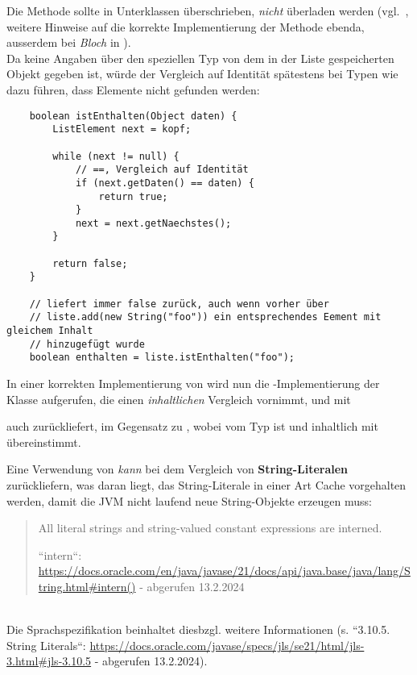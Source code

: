 Die Methode  sollte in Unterklassen überschrieben, \textit{nicht} überladen werden (vgl.~\cite[654]{Ull23}, weitere Hinweise auf die korrekte Implementierung der Methode ebenda, ausserdem bei \textit{Bloch} in \cite[37]{Blo18}).\\

\noindent
Da keine Angaben über den speziellen Typ von dem in der Liste gespeicherten Objekt gegeben ist, würde der Vergleich auf Identität spätestens bei Typen wie  dazu führen, dass Elemente nicht gefunden werden:

\begin{verbatim}
    boolean istEnthalten(Object daten) {
        ListElement next = kopf;

        while (next != null) {
            // ==, Vergleich auf Identität
            if (next.getDaten() == daten) {
                return true;
            }
            next = next.getNaechstes();
        }

        return false;
    }

    // liefert immer false zurück, auch wenn vorher über
    // liste.add(new String("foo")) ein entsprechendes Eement mit gleichem Inhalt
    // hinzugefügt wurde
    boolean enthalten = liste.istEnthalten("foo");
\end{verbatim}

In einer korrekten Implementierung von  wird nun die -Implementierung der Klasse  aufgerufen, die einen \textit{inhaltlichen} Vergleich vornimmt, und mit \begin{center}\end{center} auch  zurückliefert, im Gegensatz zu , wobei  vom Typ  ist und inhaltlich mit  übereinstimmt.\\

\begin{tcolorbox}[title=String-Literale]
Eine Verwendung von \code{==} \textit{kann} bei dem Vergleich von \textbf{String-Literalen}  zurückliefern, was daran liegt, das String-Literale in einer Art Cache vorgehalten werden, damit die JVM nicht laufend neue String-Objekte erzeugen muss:\\

\blockquote[{``intern``: \url{https://docs.oracle.com/en/java/javase/21/docs/api/java.base/java/lang/String.html#intern()} - abgerufen 13.2.2024}]{
    All literal strings and string-valued constant expressions are interned.
 }\\

\noindent
Die Sprachspezifikation beinhaltet diesbzgl. weitere Informationen (s. ``3.10.5. String Literals``: \url{https://docs.oracle.com/javase/specs/jls/se21/html/jls-3.html#jls-3.10.5} - abgerufen 13.2.2024).
\end{tcolorbox}